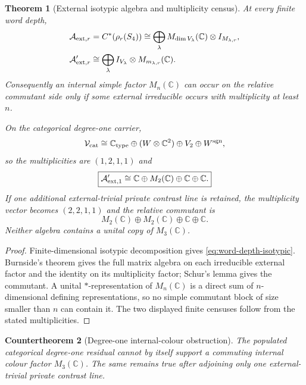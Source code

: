 \documentclass[11pt]{article}
\newtheorem{theorem}{Theorem}[section]
\newtheorem{countertheorem}[theorem]{Countertheorem}
\theoremstyle{definition}
\theoremstyle{remark}
\newcommand{\C}{\mathbb C}
\newcommand{\A}{\mathcal A}
\begin{document}
\begin{theorem}[External isotypic algebra and multiplicity census]
\label{thm:active-isotypic}
At every finite word depth,
\begin{align}
\A_{{\rm ext},r}
&=
C^*(\rho_r(S_4))
\cong
\bigoplus_\lambda
M_{\dim V_\lambda}(\C)\otimes I_{M_{\lambda,r}},
\label{eq:external-isotypic}\\
\A_{{\rm ext},r}'
&\cong
\bigoplus_\lambda
I_{V_\lambda}\otimes M_{m_{\lambda,r}}(\C).
\label{eq:external-isotypic-commutant}
\end{align}
Consequently an internal simple factor $M_n(\C)$ can occur on the relative
commutant side only if some external irreducible occurs with multiplicity at
least $n$.

On the categorical degree-one carrier,
\[
\mathcal V_{\rm cat}
\cong
\C_{\rm type}\oplus(W\otimes\C^2)\oplus V_2\oplus W^{\rm sgn},
\]
so the multiplicities are $(1,2,1,1)$ and
\begin{equation}
\boxed{
\A_{{\rm ext},1}'
\cong
\C\oplus M_2(\C)\oplus\C\oplus\C.}
\label{eq:degree-one-commutant}
\end{equation}
If one additional external-trivial private contrast line is retained, the
multiplicity vector becomes $(2,2,1,1)$ and the relative commutant is
\begin{equation}
M_2(\C)\oplus M_2(\C)\oplus\C\oplus\C.
\label{eq:degree-one-private-commutant}
\end{equation}
Neither algebra contains a unital copy of $M_3(\C)$.
\end{theorem}

\begin{proof}
Finite-dimensional isotypic decomposition gives
\eqref{eq:word-depth-isotypic}.  Burnside's theorem gives the full matrix
algebra on each irreducible external factor and the identity on its
multiplicity factor; Schur's lemma gives the commutant.  A unital
$*$-representation of $M_n(\C)$ is a direct sum of $n$-dimensional defining
representations, so no simple commutant block of size smaller than $n$ can
contain it.  The two displayed finite censuses follow from the stated
multiplicities.
\end{proof}

\begin{countertheorem}[Degree-one internal-colour obstruction]
\label{thm:degree-one-colour-no-go}
The populated categorical degree-one residual cannot by itself support a
commuting internal colour factor $M_3(\C)$.  The same remains true after
adjoining only one external-trivial private contrast line.
\end{countertheorem}
\end{document}
